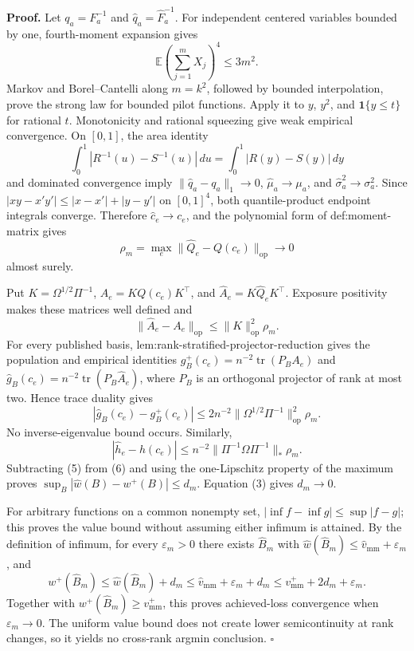 \textbf{Proof.}
Let \(q_a=F_a^{-1}\) and \(\widehat q_a=\widehat F_a^{-1}\).  For independent centered variables bounded by one, fourth-moment expansion gives
\[
\mathbb E\left(\sum_{j=1}^mX_j\right)^4\le3m^2.
\tag{1}
\]
Markov and Borel--Cantelli along \(m=k^2\), followed by bounded interpolation, prove the strong law for bounded pilot functions.  Apply it to \(y\), \(y^2\), and \(\mathbf1\{y\le t\}\) for rational \(t\).  Monotonicity and rational squeezing give weak empirical convergence.  On \([0,1]\), the area identity
\[
\int_0^1|R^{-1}(u)-S^{-1}(u)|\,du=\int_0^1|R(y)-S(y)|\,dy
\tag{2}
\]
and dominated convergence imply \(\lVert\widehat q_a-q_a\rVert_1\to0\), \(\widehat\mu_a\to\mu_a\), and \(\widehat\sigma_a^2\to\sigma_a^2\).  Since \(|xy-x'y'|\le|x-x'|+|y-y'|\) on \([0,1]^4\), both quantile-product endpoint integrals converge.  Therefore \(\widehat c_e\to c_e\), and the polynomial form of def:moment-matrix gives
\[
\rho_m=\max_e\lVert\widehat Q_e-Q(c_e)\rVert_{\mathrm{op}}\to0
\tag{3}
\]
almost surely.

Put \(K=\Omega^{1/2}\Pi^{-1}\), \(A_e=KQ(c_e)K^{\top}\), and \(\widehat A_e=K\widehat Q_eK^{\top}\).  Exposure positivity makes these matrices well defined and
\[
\lVert\widehat A_e-A_e\rVert_{\mathrm{op}}\le\lVert K\rVert_{\mathrm{op}}^2\rho_m.
\tag{4}
\]
For every published basis, lem:rank-stratified-projector-reduction gives the population and empirical identities \(g_B^+(c_e)=n^{-2}\operatorname{tr}(P_BA_e)\) and \(\widehat g_B(c_e)=n^{-2}\operatorname{tr}(P_B\widehat A_e)\), where \(P_B\) is an orthogonal projector of rank at most two.  Hence trace duality gives
\[
|\widehat g_B(c_e)-g_B^+(c_e)|
\le2n^{-2}\lVert\Omega^{1/2}\Pi^{-1}\rVert_{\mathrm{op}}^2\rho_m.
\tag{5}
\]
No inverse-eigenvalue bound occurs.  Similarly,
\[
|\widehat h_e-h(c_e)|\le n^{-2}\lVert\Pi^{-1}\Omega\Pi^{-1}\rVert_*\rho_m.
\tag{6}
\]
Subtracting (5) from (6) and using the one-Lipschitz property of the maximum proves \(\sup_B|\widehat w(B)-w^+(B)|\le d_m\).  Equation (3) gives \(d_m\to0\).

For arbitrary functions on a common nonempty set, \(|\inf f-\inf g|\le\sup|f-g|\); this proves the value bound without assuming either infimum is attained.  By the definition of infimum, for every \(\varepsilon_m>0\) there exists \(\widehat B_m\) with \(\widehat w(\widehat B_m)\le\widehat v_{\mathrm{mm}}+\varepsilon_m\), and
\[
w^+(\widehat B_m)
\le\widehat w(\widehat B_m)+d_m
\le\widehat v_{\mathrm{mm}}+\varepsilon_m+d_m
\le v_{\mathrm{mm}}^++2d_m+\varepsilon_m.
\tag{7}
\]
Together with \(w^+(\widehat B_m)\ge v_{\mathrm{mm}}^+\), this proves achieved-loss convergence when \(\varepsilon_m\to0\).  The uniform value bound does not create lower semicontinuity at rank changes, so it yields no cross-rank argmin conclusion. \(\square\)